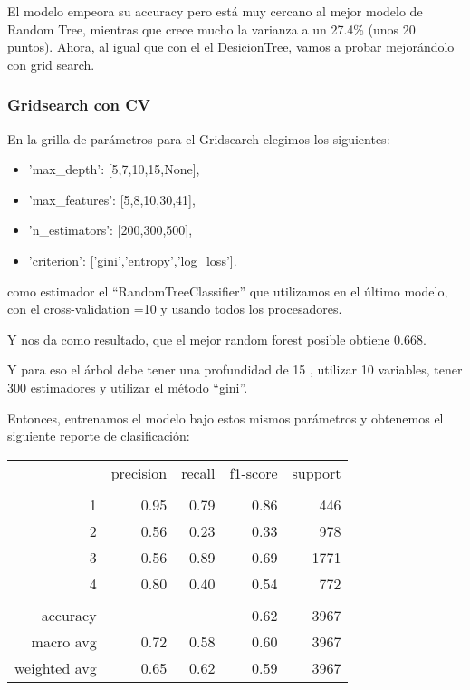 \documentclass[a4paper]{article}
\begin{document}
            El modelo empeora su accuracy pero está muy cercano al mejor modelo de Random Tree, mientras que crece mucho la varianza a un 27.4\% (unos 20 puntos). Ahora, al igual que con el el DesicionTree, vamos a probar mejorándolo con grid search.

        \subsubsection{Gridsearch con CV}

            En la grilla de parámetros para el Gridsearch elegimos los siguientes:
            \begin{itemize}
                \item 'max\_depth': [5,7,10,15,None],
                \item 'max\_features': [5,8,10,30,41],
                \item 'n\_estimators': [200,300,500],
                \item 'criterion': ['gini','entropy','log\_loss'].
            \end{itemize}
            como estimador el ``RandomTreeClassifier'' que utilizamos en el último modelo, con el cross-validation =10 y  usando todos los procesadores.

            Y nos da como resultado, que el mejor random forest posible obtiene 0.668. 

            Y para eso el árbol debe tener una profundidad de 15 , utilizar  10  variables, tener  300  estimadores y utilizar el método ``gini''.
            
            Entonces, entrenamos el modelo bajo estos mismos parámetros y obtenemos el siguiente reporte de clasificación:

            \begin{table}[!ht]
                \centering
                \begin{tabular}{rrrrr}
                    ~ & precision & recall & f1-score & support \\
                    & & & & \\
                    1 & 0.95 & 0.79 & 0.86 & 446 \\
                    2 & 0.56 & 0.23 & 0.33 & 978 \\
                    3 & 0.56 & 0.89 & 0.69 & 1771 \\
                    4 & 0.80 & 0.40 & 0.54 & 772 \\
                    & & & & \\
                    accuracy & & & 0.62 & 3967 \\
                    macro avg & 0.72 & 0.58 & 0.60 & 3967 \\
                    weighted avg & 0.65 & 0.62 & 0.59 & 3967 \\
                \end{tabular}
            \end{table}
            
\end{document}
